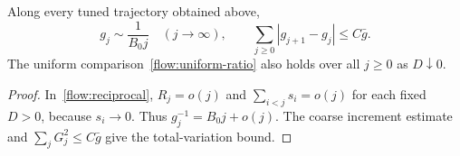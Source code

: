 \begin{corollary}\label{flow:variance}
Along every tuned trajectory obtained above,
\begin{equation}\label{flow:variance-asymptotic}
 g_j\sim\frac1{B_0j}\quad(j\to\infty),\qquad
 \sum_{j\ge0}|g_{j+1}-g_j|\le C\bar g.
\end{equation}
The uniform comparison~\eqref{flow:uniform-ratio} also holds over all
$j\ge0$ as $D\downarrow0$.
\end{corollary}

\begin{proof}
In~\eqref{flow:reciprocal}, $R_j=o(j)$ and
$\sum_{i<j}s_i=o(j)$ for each fixed $D>0$, because $s_i\to0$.
Thus $g_j^{-1}=B_0j+o(j)$.  The coarse increment estimate and
$\sum_jG_j^2\le C\bar g$ give the total-variation bound.
\end{proof}

